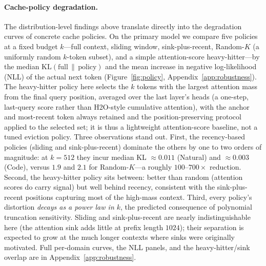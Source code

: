 \documentclass[11pt]{article}
\newcommand{\KLs}{\mathrm{KL}}
\theoremstyle{plain}
\theoremstyle{definition}
\theoremstyle{remark}
\begin{document}
\paragraph{Cache-policy degradation.}
\label{sec:exp-policy}
The distribution-level findings above translate directly into the
degradation curves of concrete cache policies. On the primary model
we compare five policies at a fixed budget $k$---full context,
sliding window, sink-plus-recent, Random-$K$ (a uniformly random
$k$-token subset), and a simple attention-score heavy-hitter---by the
median $\KLs(\text{full}\,\|\,\text{policy})$ and the mean increase in
negative log-likelihood (NLL) of the actual next token
(Figure~\ref{fig:policy}, Appendix~\ref{app:robustness}). The heavy-hitter policy here selects the
$k$ tokens with the largest attention mass from the final query
position, averaged over the last layer's heads (a one-step,
last-query score rather than H2O-style cumulative attention), with
the anchor and most-recent token always retained and the
position-preserving protocol applied to the selected set; it is thus
a lightweight attention-score baseline, not a tuned eviction policy.
Three observations stand out. First, the
recency-based policies (sliding and sink-plus-recent) dominate the
others by one to two orders of magnitude: at $k = 512$ they incur
median KL $\approx 0.011$ (Natural) and $\approx 0.003$ (Code),
versus $1.9$ and $2.1$ for Random-$K$---a roughly $100$--$700\times$
reduction. Second, the heavy-hitter policy sits between: better than
random (attention scores do carry signal) but well behind recency,
consistent with the sink-plus-recent positions capturing most of the
high-mass context. Third, every policy's distortion \emph{decays as a
power law in $k$}, the predicted consequence of polynomial truncation
sensitivity. Sliding and sink-plus-recent are nearly
indistinguishable here (the attention sink adds little at prefix
length $1024$); their separation is expected to grow at the much
longer contexts where sinks were originally motivated. Full per-domain
curves, the NLL panels, and the heavy-hitter/sink overlap are in
Appendix~\ref{app:robustness}.
\end{document}
